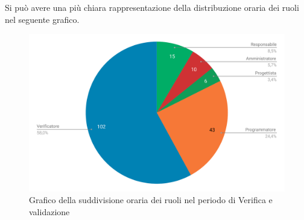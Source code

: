 Si può avere una più chiara rappresentazione della distribuzione oraria dei ruoli nel seguente grafico.

\begin{figure}[H]
	\includegraphics[width=1\linewidth]{Preventivo/grafici/VV2_1.pdf}
	\caption{Grafico della suddivisione oraria dei ruoli nel periodo di Verifica e validazione}
\end{figure}

